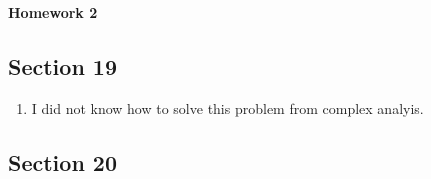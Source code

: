 \documentclass[11pt, reqno]{article}
\theoremstyle{plain}
\theoremstyle{definition}
\theoremstyle{remark}
\begin{document}
\topmargin=-40pt
\renewcommand{\headrulewidth}{1pt}
\renewcommand{\headsep}{20pt}
\thispagestyle{fancy}

{\Huge \bfseries \noindent Homework 2}

\subsection*{Section 19}

\begin{enumerate}

    \item[2.] I did not know how to solve this problem from complex analyis.

\end{enumerate}

\subsection*{Section 20}
\end{document}
